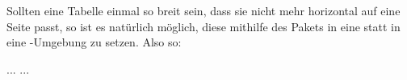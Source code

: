 %
%
%
%
%
%
%
%
%
%
%
%
%
%
Sollten eine Tabelle einmal so breit sein, dass sie nicht mehr horizontal auf
eine Seite passt, so ist es natürlich möglich, diese mithilfe des Pakets
 \parencite{Sommerfeldt2004} in eine
 statt in eine -Umgebung zu setzen.
Also so:
\begin{latex}[caption={Gedrehte Tabelle},label={lst:rotated-table}]
\begin{sidewaystable}
  \centering%
  \begin{tabular}{...}%
    ...
  \end{tabular}%
  \caption{Bezeichnung}%
  \label{Referenzmarke}%
\end{sidewaystable}%
\end{latex}


